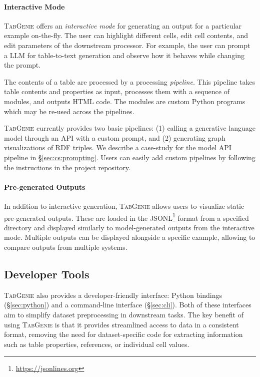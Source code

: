 \paragraph{Interactive Mode}
\textsc{TabGenie} offers an \textit{interactive mode} for generating an output for a particular example on-the-fly. The user can highlight different cells, edit cell contents, and edit parameters of the downstream processor. For example, the user can prompt a LLM for table-to-text generation and observe how it behaves while changing the prompt.

The contents of a table are processed by a processing \textit{pipeline}. This pipeline takes table contents and properties as input, processes them with a sequence of modules, and outputs HTML code. The modules are custom Python programs which may be re-used across the pipelines.

\textsc{TabGenie} currently provides two basic pipelines: (1) calling a generative language model through an API with a custom prompt, and (2) generating graph visualizations of RDF triples. We describe a case-study for the model API pipeline in §\ref{sec:cs:prompting}. Users can easily add custom pipelines by following the instructions in the project repository.

\paragraph{Pre-generated Outputs}
In addition to interactive generation, \textsc{TabGenie} allows users to visualize static pre-generated outputs. These are loaded in the JSONL\footnote{\url{https://jsonlines.org}} format from a specified directory and displayed similarly to model-generated outputs from the interactive mode. Multiple outputs can be displayed alongside a specific example, allowing to compare outputs from multiple systems.


\subsection{Developer Tools}
\label{sec:tabgenie:developer}

\textsc{TabGenie} also provides a developer-friendly interface: Python bindings (§\ref{sec:python}) and a command-line interface (§\ref{sec:cli}). Both of these interfaces aim to simplify dataset preprocessing in downstream tasks. The key benefit of using \textsc{TabGenie} is that it provides streamlined access to data in a consistent format, removing the need for dataset-specific code for extracting information such as table properties, references, or individual cell values.




